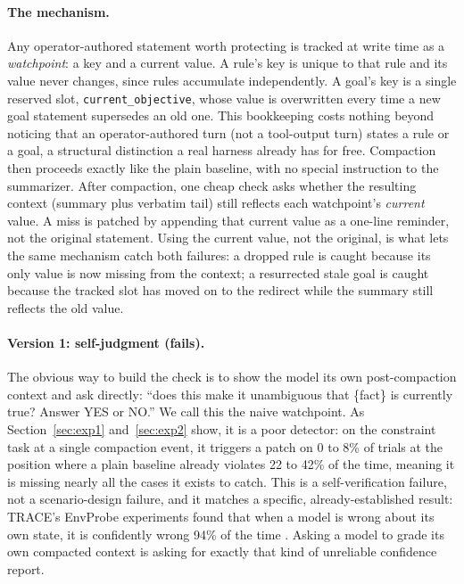 \documentclass[11pt]{article}
\begin{document}
\paragraph{The mechanism.} Any operator-authored statement worth protecting is tracked at write time as a \emph{watchpoint}: a key and a current value. A rule's key is unique to that rule and its value never changes, since rules accumulate independently. A goal's key is a single reserved slot, \texttt{current\_objective}, whose value is overwritten every time a new goal statement supersedes an old one. This bookkeeping costs nothing beyond noticing that an operator-authored turn (not a tool-output turn) states a rule or a goal, a structural distinction a real harness already has for free. Compaction then proceeds exactly like the plain baseline, with no special instruction to the summarizer. After compaction, one cheap check asks whether the resulting context (summary plus verbatim tail) still reflects each watchpoint's \emph{current} value. A miss is patched by appending that current value as a one-line reminder, not the original statement. Using the current value, not the original, is what lets the same mechanism catch both failures: a dropped rule is caught because its only value is now missing from the context; a resurrected stale goal is caught because the tracked slot has moved on to the redirect while the summary still reflects the old value.

\paragraph{Version 1: self-judgment (fails).} The obvious way to build the check is to show the model its own post-compaction context and ask directly: ``does this make it unambiguous that \{fact\} is currently true? Answer YES or NO.'' We call this the naive watchpoint. As Section~\ref{sec:exp1} and~\ref{sec:exp2} show, it is a poor detector: on the constraint task at a single compaction event, it triggers a patch on 0 to 8\% of trials at the position where a plain baseline already violates 22 to 42\% of the time, meaning it is missing nearly all the cases it exists to catch. This is a self-verification failure, not a scenario-design failure, and it matches a specific, already-established result: TRACE's EnvProbe experiments found that when a model is wrong about its own state, it is confidently wrong 94\% of the time \cite{trace}. Asking a model to grade its own compacted context is asking for exactly that kind of unreliable confidence report.
\end{document}
